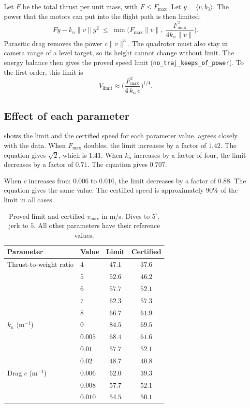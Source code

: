 \documentclass[11pt]{article}
\newcommand{\ip}[2]{\langle #1,#2\rangle}
\newcommand{\norm}[1]{\lVert #1\rVert}
\newcommand{\lean}[1]{\texttt{\small #1}}
\begin{document}
Let $F$ be the total thrust per unit mass, with $F \le F_{\max}$.
Let $y = \ip{v}{b_3}$.
The power that the motors can put into the flight path is then limited:
\begin{equation}
  F y - k_n\norm v y^2 \;\le\; \min\!\Big(F_{\max}\norm v,\; \frac{F_{\max}^2}{4k_n\norm v}\Big).
  \label{eq:power}
\end{equation}
Parasitic drag removes the power $c\norm v^3$.
The quadrotor must also stay in camera range of a level target, so its height cannot change
without limit.
The energy balance then gives the proved speed limit (\lean{no\_traj\_keeps\_of\_power}).
To the first order, this limit is
\begin{equation}
  V_{\mathrm{limit}} \approx \Big(\frac{F_{\max}^2}{4\,k_n\,c}\Big)^{1/4}.
  \label{eq:wall}
\end{equation}

\subsection{Effect of each parameter}

 shows the limit and the certified speed for each parameter value.
 agrees closely with the data.
When $F_{\max}$ doubles, the limit increases by a factor of $1.42$.
The equation gives $\sqrt2$, which is $1.41$.
When $k_n$ increases by a factor of four, the limit decreases by a factor of $0.71$.
The equation gives $0.707$.

When $c$ increases from $0.006$ to $0.010$, the limit decreases by a factor of $0.88$.
The equation gives the same value.
The certified speed is approximately $90\%$ of the limit in all cases.

\begin{table}[h]
\centering
\caption{Proved limit and certified $v_{\max}$ in m/s. Dives to $5^\circ$, jerk to $5$. All other
parameters have their reference values.}
\label{tab:speed}
\begin{tabular}{@{}llcc@{}}
\toprule
Parameter & Value & Limit & Certified \\
\midrule
Thrust-to-weight ratio & $4$ & $47.1$ & $37.6$ \\
 & $5$ & $52.6$ & $46.2$ \\
 & $6$ & $57.7$ & $52.1$ \\
 & $7$ & $62.3$ & $57.3$ \\
 & $8$ & $66.7$ & $61.9$ \\
\midrule
$k_n$ (m$^{-1}$) & $0$ & $84.5$ & $69.5$ \\
 & $0.005$ & $68.4$ & $61.6$ \\
 & $0.01$ & $57.7$ & $52.1$ \\
 & $0.02$ & $48.7$ & $40.8$ \\
\midrule
Drag $c$ (m$^{-1}$) & $0.006$ & $62.0$ & $39.3$ \\
 & $0.008$ & $57.7$ & $52.1$ \\
 & $0.010$ & $54.5$ & $50.1$ \\
\bottomrule
\end{tabular}
\end{table}
\end{document}
